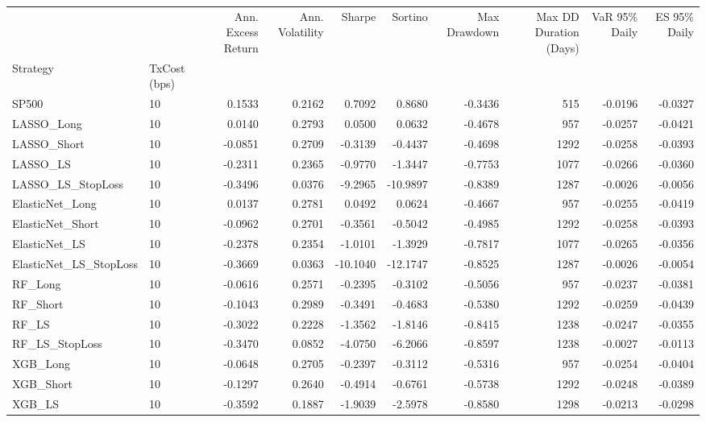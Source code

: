 \begin{tabular}{llrrrrrrrr}
\toprule
 &  & Ann. Excess Return & Ann. Volatility & Sharpe & Sortino & Max Drawdown & Max DD Duration (Days) & VaR 95\% Daily & ES 95\% Daily \\
Strategy & TxCost (bps) &  &  &  &  &  &  &  &  \\
\midrule
SP500 & 10 & 0.1533 & 0.2162 & 0.7092 & 0.8680 & -0.3436 & 515 & -0.0196 & -0.0327 \\
\cline{1-10}
LASSO\_Long & 10 & 0.0140 & 0.2793 & 0.0500 & 0.0632 & -0.4678 & 957 & -0.0257 & -0.0421 \\
\cline{1-10}
LASSO\_Short & 10 & -0.0851 & 0.2709 & -0.3139 & -0.4437 & -0.4698 & 1292 & -0.0258 & -0.0393 \\
\cline{1-10}
LASSO\_LS & 10 & -0.2311 & 0.2365 & -0.9770 & -1.3447 & -0.7753 & 1077 & -0.0266 & -0.0360 \\
\cline{1-10}
LASSO\_LS\_StopLoss & 10 & -0.3496 & 0.0376 & -9.2965 & -10.9897 & -0.8389 & 1287 & -0.0026 & -0.0056 \\
\cline{1-10}
ElasticNet\_Long & 10 & 0.0137 & 0.2781 & 0.0492 & 0.0624 & -0.4667 & 957 & -0.0255 & -0.0419 \\
\cline{1-10}
ElasticNet\_Short & 10 & -0.0962 & 0.2701 & -0.3561 & -0.5042 & -0.4985 & 1292 & -0.0258 & -0.0393 \\
\cline{1-10}
ElasticNet\_LS & 10 & -0.2378 & 0.2354 & -1.0101 & -1.3929 & -0.7817 & 1077 & -0.0265 & -0.0356 \\
\cline{1-10}
ElasticNet\_LS\_StopLoss & 10 & -0.3669 & 0.0363 & -10.1040 & -12.1747 & -0.8525 & 1287 & -0.0026 & -0.0054 \\
\cline{1-10}
RF\_Long & 10 & -0.0616 & 0.2571 & -0.2395 & -0.3102 & -0.5056 & 957 & -0.0237 & -0.0381 \\
\cline{1-10}
RF\_Short & 10 & -0.1043 & 0.2989 & -0.3491 & -0.4683 & -0.5380 & 1292 & -0.0259 & -0.0439 \\
\cline{1-10}
RF\_LS & 10 & -0.3022 & 0.2228 & -1.3562 & -1.8146 & -0.8415 & 1238 & -0.0247 & -0.0355 \\
\cline{1-10}
RF\_LS\_StopLoss & 10 & -0.3470 & 0.0852 & -4.0750 & -6.2066 & -0.8597 & 1238 & -0.0027 & -0.0113 \\
\cline{1-10}
XGB\_Long & 10 & -0.0648 & 0.2705 & -0.2397 & -0.3112 & -0.5316 & 957 & -0.0254 & -0.0404 \\
\cline{1-10}
XGB\_Short & 10 & -0.1297 & 0.2640 & -0.4914 & -0.6761 & -0.5738 & 1292 & -0.0248 & -0.0389 \\
\cline{1-10}
XGB\_LS & 10 & -0.3592 & 0.1887 & -1.9039 & -2.5978 & -0.8580 & 1298 & -0.0213 & -0.0298 \\

\end{tabular}
